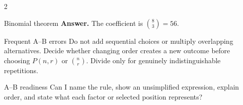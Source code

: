 \documentclass[10pt]{article}
\begin{document}
\begin{multicols}{2}
\begin{definitionbox}{Binomial theorem}
\textbf{Answer.} The coefficient is $\binom83=56$.
\end{definitionbox}

\begin{warningbox}{Frequent A--B errors}
Do not add sequential choices or multiply overlapping alternatives. Decide
whether changing order creates a new outcome before choosing $P(n,r)$ or
$\binom nr$. Divide only for genuinely indistinguishable repetitions.
\end{warningbox}

\begin{checklistbox}{A--B readiness}
Can I name the rule, show an unsimplified expression, explain order, and state
what each factor or selected position represents?
\end{checklistbox}
\end{multicols}
\end{document}
